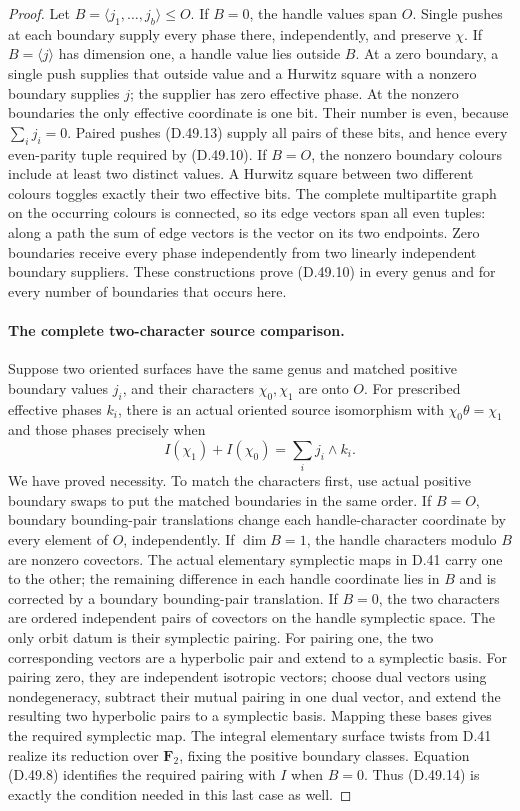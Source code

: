\begin{proof}
Let \(B=\langle j_1,\ldots,j_b\rangle\leq O\).
If \(B=0\), the handle values span \(O\). Single pushes at each
boundary supply every phase there, independently, and preserve \(\chi\).
If \(B=\langle j\rangle\) has dimension one, a handle value lies
outside \(B\). At a zero boundary, a single push supplies that outside
value and a Hurwitz square with a nonzero boundary supplies \(j\);
the supplier has zero effective phase. At the nonzero boundaries the
only effective coordinate is one bit. Their number is even, because
\(\sum_i j_i=0\). Paired pushes \textup{(D.49.13)} supply all pairs
of these bits, and hence every even-parity tuple required by
\textup{(D.49.10)}.
If \(B=O\), the nonzero boundary colours include at least two distinct
values. A Hurwitz square between two different colours toggles exactly
their two effective bits. The complete multipartite graph on the
occurring colours is connected, so its edge vectors span all even
tuples: along a path the sum of edge vectors is the vector on its two
endpoints. Zero boundaries receive every phase independently from two
linearly independent boundary suppliers. These constructions prove
\textup{(D.49.10)} in every genus and for every number of boundaries
that occurs here.

\paragraph{The complete two-character source comparison.}
Suppose two oriented surfaces have the same genus and matched positive
boundary values \(j_i\), and their characters \(\chi_0,\chi_1\) are
onto \(O\). For prescribed effective phases \(k_i\), there is an
actual oriented source isomorphism with
\(\chi_0\theta=\chi_1\) and those phases precisely when
\[
              I(\chi_1)+I(\chi_0)=\sum_i j_i\wedge k_i.
 \tag{D.49.14}
\]
We have proved necessity. To match the characters first, use actual
positive boundary swaps to put the matched boundaries in the same
order. If \(B=O\), boundary bounding-pair translations change each
handle-character coordinate by every element of \(O\), independently.
If \(\dim B=1\), the handle characters modulo \(B\) are nonzero
covectors. The actual elementary symplectic maps in D.41 carry one to
the other; the remaining difference in each handle coordinate lies
in \(B\) and is corrected by a boundary bounding-pair translation.
If \(B=0\), the two characters are ordered independent pairs of
covectors on the handle symplectic space. The only orbit datum is their
symplectic pairing. For pairing one, the two corresponding vectors are
a hyperbolic pair and extend to a symplectic basis. For pairing zero,
they are independent isotropic vectors; choose dual vectors using
nondegeneracy, subtract their mutual pairing in one dual vector, and
extend the resulting two hyperbolic pairs to a symplectic basis.
Mapping these bases gives the required symplectic map.
The integral elementary surface twists from D.41 realize its reduction
over \(\mathbf F_2\), fixing the positive boundary classes.
Equation \textup{(D.49.8)} identifies the required pairing with \(I\)
when \(B=0\). Thus \textup{(D.49.14)} is exactly the condition needed
in this last case as well.


\end{proof}
